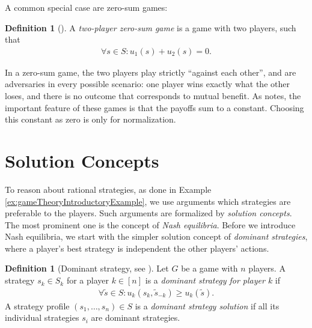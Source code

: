 \documentclass[a4paper,DIV=11,abstracton,twoside=semi]{scrreprt}
\theoremstyle{definition}
\newtheorem{defn}[thm]{Definition} %
\begin{document}
    A common special case are zero-sum games:
    
    \begin{defn}[{\cite[p.4]{bib:fudenbergGameTheory}}]
        A \emph{two-player zero-sum game} is a game with two players, such that
        \begin{gather*} 
            \forall s \in S: u_1(s) + u_2(s) = 0.
        \end{gather*}
    \end{defn}

    In a zero-sum game, the two players play strictly “against each other”, and are adversaries in every possible scenario:
    one player wins exactly what the other loses, and there is no outcome that corresponds to mutual benefit. As \cite{bib:fudenbergGameTheory} notes, the important feature of these games is that the payoffs sum to a constant. 
    Choosing this constant as zero is only for normalization.
    
    \section{Solution Concepts}
    To reason about rational strategies, as done in Example \ref{ex:gameTheoryIntroductoryExample}, we use arguments which strategies are preferable to the players. Such arguments are formalized by \emph{solution concepts}.
    The most prominent one is the concept of \emph{Nash equilibria}.
    Before we introduce Nash equilibria, we start with the simpler solution concept of \emph{dominant strategies}, where a player's best strategy is independent the other players' actions.
    
    \begin{defn}[Dominant strategy, see \cite{bib:nisanAlgorithmicGameTheoryCh1Basic}]
        Let $G$ be a game with $n$ players.
        A strategy $s_k \in S_k$ for a player $k \in [n]$ is a \emph{dominant strategy for player $k$} if 
        \begin{gather*}  
            \forall \tilde{s} \in S: u_k(s_k, \tilde{s}_{-k}) \geq u_k(\tilde{s}). 
        \end{gather*} 
        A strategy profile $(s_1, \dots, s_n) \in S$ is a \emph{dominant strategy solution} if all its individual strategies $s_i$ are dominant strategies.
    \end{defn}
    
\end{document}
